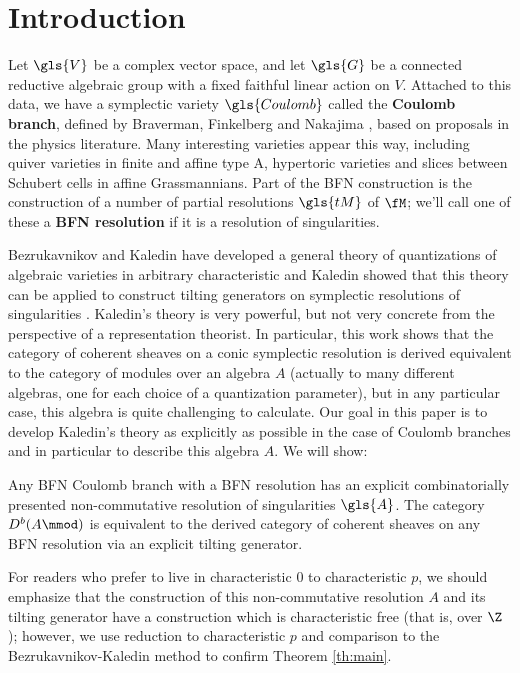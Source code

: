 

\section{Introduction}
\label{sec:introduction}

Let $\gls{V}$ be a complex vector space, and let $\gls{G}$ be a connected reductive
algebraic group with a fixed faithful linear action on $V$. 
Attached to this data, we have a symplectic variety $\gls{Coulomb}$ called the {\bf
  Coulomb branch}, defined by Braverman, Finkelberg and Nakajima \cite{BFN},
based on proposals in the physics literature. Many interesting
varieties appear this way, including quiver varieties in finite and
affine type A, hypertoric varieties and slices between Schubert cells in affine Grassmannians.  Part of the BFN construction is
the construction of a number of partial resolutions $\gls{tM}$ of $\fM$; we'll
call one of these a {\bf BFN resolution} if it is a resolution of singularities.

Bezrukavnikov and Kaledin have developed a general theory of quantizations
of algebraic varieties in arbitrary characteristic
\cite{BK04a,BKpos} and Kaledin showed that this theory can
be applied to construct tilting generators on symplectic resolutions
of singularities \cite{KalDEQ}.  Kaledin's theory is very powerful,
but not very concrete from the perspective of a representation theorist.
In particular, this work shows that the category of coherent sheaves on a conic
symplectic resolution is derived equivalent to the category of modules
over an algebra $A$ (actually to many different algebras, one for each 
choice of a quantization parameter), but in any particular case, this algebra is quite
challenging to calculate.  Our goal in this paper is to develop
Kaledin's theory as explicitly as possible in the case of Coulomb
branches and in particular to describe this algebra $A$.  We will show:
\begin{itheorem}\label{th:main}
Any BFN Coulomb branch with a BFN resolution has an explicit
combinatorially presented non-commutative resolution of singularities
$\gls{A}$.  The category $D^b(A\mmod)$ is  equivalent to the derived category of coherent sheaves on any BFN resolution via an explicit tilting generator.
\end{itheorem}
For readers who prefer to live in characteristic 0 to characteristic
$p$, we should emphasize that the construction of this non-commutative
resolution $A$ and its tilting generator have a construction which is
characteristic free (that is, over $\Z$);  however, we use reduction
to characteristic $p$ and comparison to the Bezrukavnikov-Kaledin
method to confirm Theorem \ref{th:main}.

